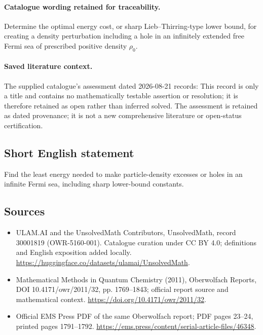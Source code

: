 \documentclass[11pt]{article}
\begin{document}
\paragraph{Catalogue wording retained for traceability.}
Determine the optimal energy cost, or sharp Lieb–Thirring-type lower bound, for creating a density perturbation including a hole in an infinitely extended free Fermi sea of prescribed positive density $\rho_0$.

\paragraph{Saved literature context.} The supplied catalogue's assessment dated 2026-08-21 records: This record is only a title and contains no mathematically testable assertion or resolution; it is therefore retained as open rather than inferred solved. The assessment is retained as dated provenance; it is not a new comprehensive literature or open-status certification.
\subsection{Short English statement}
Find the least energy needed to make particle-density excesses or holes in an infinite Fermi sea, including sharp lower-bound constants.
\subsection{Sources}
\begin{itemize}
\item[\hypertarget{source:30001819:1}{S1}] ULAM.AI and the UnsolvedMath Contributors, UnsolvedMath, record 30001819 (OWR-5160-001). Catalogue curation under CC BY 4.0; definitions and English exposition added locally.
\url{https://huggingface.co/datasets/ulamai/UnsolvedMath}.
\item[\hypertarget{source:30001819:2}{S2}] Mathematical Methods in Quantum Chemistry (2011), Oberwolfach Reports, DOI 10.4171/owr/2011/32, pp. 1769--1843; official report source and mathematical context.
\url{https://doi.org/10.4171/owr/2011/32}.
\item[\hypertarget{source:30001819:3}{S3}] Official EMS Press PDF of the same Oberwolfach report; PDF pages 23--24, printed pages 1791--1792.
\url{https://ems.press/content/serial-article-files/46348}.
\end{itemize}
\label{end:30001819}
\end{document}

